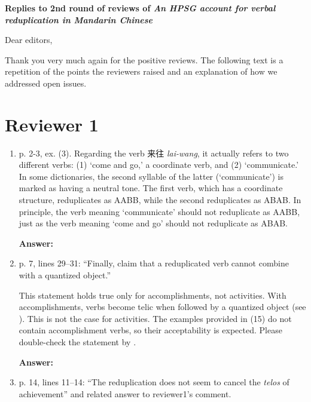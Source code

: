 \documentclass[fleqn,twoside]{article}
\begin{document}
\noindent
{\large\bf Replies to 2nd round of reviews of \emph{An HPSG account for verbal reduplication in Mandarin Chinese}}

\noindent
Dear editors,

Thank you very much again for the positive reviews. The following text is a repetition of the points the
reviewers raised and an explanation of how we addressed open issues.

\section{Reviewer 1}\label{sec:1}

\begin{enumerate}
\item p. 2-3, ex. (3). Regarding the verb 来往 \textit{lai-wang}, it actually refers to two different verbs: (1) `come
and go,' a coordinate verb, and (2) `communicate.' In some dictionaries, the second syllable of the
latter (`communicate') is marked as having a neutral tone. The first verb, which has a coordinate
structure, reduplicates as AABB, while the second reduplicates as ABAB. In principle, the verb
meaning `communicate' should not reduplicate as AABB, just as the verb meaning `come and go'
should not reduplicate as ABAB.

\noindent
\textbf{Answer:}

\item p. 7, lines 29--31: ``Finally, \citet[322]{SuiHu2016} claim that a reduplicated verb cannot combine with
a quantized object.''

This statement holds true only for accomplishments, not activities. With accomplishments, verbs
become telic when followed by a quantized object (see \citealt{Verkuyl1972}). This is not the case for
activities. The examples provided in (15) do not contain accomplishment verbs, so their acceptability
is expected. Please double-check the statement by  \citet[322]{SuiHu2016}.

\noindent
\textbf{Answer:}

\item p. 14, lines 11--14: ``The reduplication does not seem to cancel the \textit{telos} of achievement'' and related
answer to reviewer1’s comment.


\end{enumerate}
\end{document}
